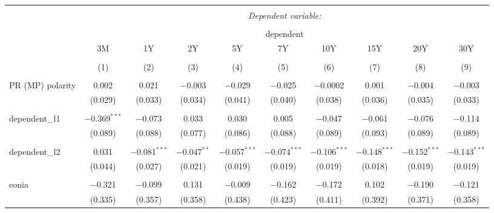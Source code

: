 


\begin{table}[!htbp] \centering 
  \caption{} 
  \label{} 
  \begin{adjustbox}{width=1.35\textwidth}
\begin{tabular}{@{\extracolsep{5pt}}lccccccccc} 
\\[-1.8ex]\hline 
\hline \\[-1.8ex] 
 & \multicolumn{9}{c}{\textit{Dependent variable:}} \\ 
\cline{2-10} 
\\[-1.8ex] & \multicolumn{9}{c}{dependent} \\ 
 & 3M & 1Y & 2Y & 5Y & 7Y & 10Y & 15Y & 20Y & 30Y \\ 
\\[-1.8ex] & (1) & (2) & (3) & (4) & (5) & (6) & (7) & (8) & (9)\\ 
\hline \\[-1.8ex] 
 PR (MP) polarity & 0.002 & 0.021 & $-$0.003 & $-$0.029 & $-$0.025 & $-$0.0002 & 0.001 & $-$0.004 & $-$0.003 \\ 
  & (0.029) & (0.033) & (0.034) & (0.041) & (0.040) & (0.038) & (0.036) & (0.035) & (0.033) \\ 
  & & & & & & & & & \\ 
 dependent\_l1 & $-$0.369$^{***}$ & $-$0.073 & 0.033 & 0.030 & 0.005 & $-$0.047 & $-$0.061 & $-$0.076 & $-$0.114 \\ 
  & (0.089) & (0.088) & (0.077) & (0.086) & (0.088) & (0.089) & (0.093) & (0.089) & (0.089) \\ 
  & & & & & & & & & \\ 
 dependent\_l2 & 0.031 & $-$0.081$^{***}$ & $-$0.047$^{**}$ & $-$0.057$^{***}$ & $-$0.074$^{***}$ & $-$0.106$^{***}$ & $-$0.148$^{***}$ & $-$0.152$^{***}$ & $-$0.143$^{***}$ \\ 
  & (0.044) & (0.027) & (0.021) & (0.019) & (0.019) & (0.019) & (0.018) & (0.019) & (0.019) \\ 
  & & & & & & & & & \\ 
 eonia & $-$0.321 & $-$0.099 & 0.131 & $-$0.009 & $-$0.162 & $-$0.172 & 0.102 & $-$0.190 & $-$0.121 \\ 
  & (0.335) & (0.357) & (0.358) & (0.438) & (0.423) & (0.411) & (0.392) & (0.371) & (0.358) \\ 

\end{tabular}
\end{adjustbox}
\end{table}
